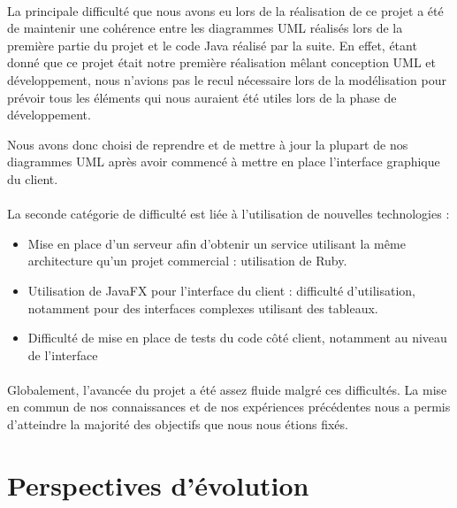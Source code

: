 \documentclass[titlepage]{report}
\begin{document}
\paragraph{} La principale difficulté que nous avons eu lors de la réalisation de ce projet a été de maintenir une cohérence entre les diagrammes UML réalisés lors de la première partie du projet et le code Java réalisé par la suite.
En effet, étant donné que ce projet était notre première réalisation mêlant conception UML et développement, nous n'avions pas le recul nécessaire lors de la modélisation pour prévoir tous les éléments qui nous auraient été utiles lors de la phase de développement.

\par{} Nous avons donc choisi de reprendre et de mettre à jour la plupart de nos diagrammes UML après avoir commencé à mettre en place l'interface graphique du client. 

\paragraph{} La seconde catégorie de difficulté est liée à l'utilisation de nouvelles technologies : \begin{itemize}
	\item Mise en place d'un serveur afin d'obtenir un service utilisant la même architecture qu'un projet commercial : utilisation de Ruby.
	\item Utilisation de JavaFX pour l'interface du client : difficulté d'utilisation, notamment pour des interfaces complexes utilisant des tableaux.
	\item Difficulté de mise en place de tests du code côté client, notamment au niveau de l'interface
\end{itemize}

\paragraph{} Globalement, l'avancée du projet a été assez fluide malgré ces difficultés. La mise en commun de nos connaissances et de nos expériences précédentes nous a permis d'atteindre la majorité des objectifs que nous nous étions fixés.

\section{Perspectives d'évolution}
\end{document}
